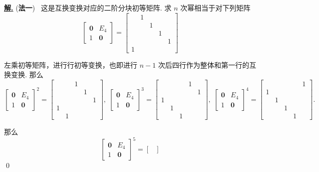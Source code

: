 \documentclass[10pt,openany]{article}
\theoremstyle{thmstyle} %
\theoremstyle{defstyle} %
\theoremstyle{prostyle} %
\theoremstyle{exastyle}
\theoremstyle{remstyle}
\newenvironment{solution}{\par\underline{\textbf{解.}} \;\fangsong}{\qed\par}
\begin{document}
\begin{solution}
	(\textbf{法一}) \ 这是互换变换对应的二阶分块初等矩阵. 求 \( n \) 次幂相当于对下列矩阵
	\[ \begin{bmatrix}
		\bm{0} & E_4 \\ 1 & \bm{0}
	\end{bmatrix}=\begin{bmatrix}
		 & 1  & & & \\
		 &  & 1 & & \\
		 &  & & 1 & \\
		 &  & & & 1 \\
		 1 & & & & 
	\end{bmatrix} \]
	
	左乘初等矩阵，进行行初等变换，也即进行 \( n-1 \) 次后四行作为整体和第一行的互换变换. 那么
	\[ \begin{bmatrix}
		\bm{0} & E_4 \\ 1 & \bm{0}
	\end{bmatrix}^2=\begin{bmatrix}
     &  & 1 & & \\
     &  & & 1 & \\
     &  & & & 1 \\
     1 & & & & \\
     & 1  & & & 
	\end{bmatrix}, \; \begin{bmatrix}
	\bm{0} & E_4 \\ 1 & \bm{0}
	\end{bmatrix}^3=\begin{bmatrix}
	&  & & 1 & \\
	&  & & & 1 \\
	1 & & & & \\
	& 1  & & & \\
	&  & 1 & & 
	\end{bmatrix}, \; \begin{bmatrix}
	\bm{0} & E_4 \\ 1 & \bm{0}
	\end{bmatrix}^4=\begin{bmatrix}
	&  & & & 1 \\
	1 & & & & \\
	& 1  & & & \\
	&  & 1 & & \\
	&  & & 1 & 
	\end{bmatrix}. \]
	
	那么
	\[ \begin{bmatrix}
		\bm{0} & E_4 \\ 1 & \bm{0}
	\end{bmatrix}^5=\begin{bmatrix}


\end{bmatrix}\]
\end{solution}
\end{document}
